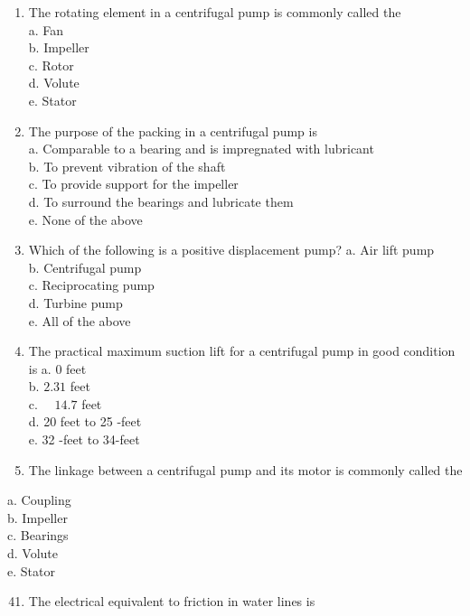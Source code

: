 \documentclass[10pt]{article}
\begin{document}
\begin{enumerate}
\begin{enumerate}
\begin{enumerate}
  \item The rotating element in a centrifugal pump is commonly called the\\
a. Fan\\
b. Impeller\\
c. Rotor\\
d. Volute\\
e. Stator

  \item The purpose of the packing in a centrifugal pump is\\
a. Comparable to a bearing and is impregnated with lubricant\\
b. To prevent vibration of the shaft\\
c. To provide support for the impeller\\
d. To surround the bearings and lubricate them\\
e. None of the above\\

  \item Which of the following is a positive displacement pump?
a. Air lift pump\\
b. Centrifugal pump\\
c. Reciprocating pump\\
d. Turbine pump\\
e. All of the above\\

  \item The practical maximum suction lift for a centrifugal pump in good condition is
a. 0 feet\\
b. $2.31$ feet\\
c. $\quad 14.7$ feet\\
d. 20 feet to 25 -feet\\
e. 32 -feet to 34-feet\\

  \item The linkage between a centrifugal pump and its motor is commonly called the
  \end{enumerate}
a. Coupling\\
b. Impeller\\
c. Bearings\\
d. Volute\\
e. Stator

\begin{enumerate}
  \setcounter{enumi}{40}
  \item The electrical equivalent to friction in water lines is
\end{enumerate}


\end{enumerate}
\end{enumerate}
\end{document}
